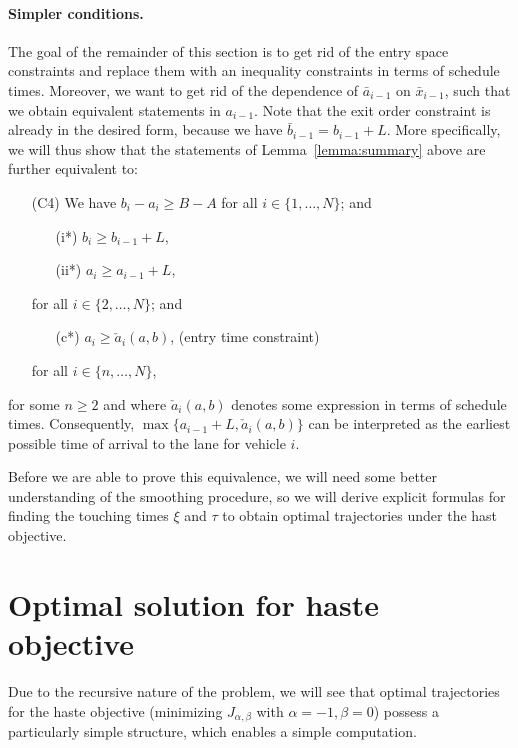 \documentclass[a4paper]{report}
\theoremstyle{definition}
\theoremstyle{plain}
\newcommand\note[1]{{\color{Navy}#1}}
\begin{document}
\paragraph{Simpler conditions.}
The goal of the remainder of this section is to get rid of the entry space
constraints and replace them with an inequality constraints in terms of schedule
times.
%
Moreover, we want to get rid of the dependence of $\bar{a}_{i-1}$ on
$\bar{x}_{i-1}$, such that we obtain equivalent statements in $a_{i-1}$. Note
that the exit order constraint is already in the desired form, because we have
$\bar{b}_{i-1} = b_{i-1} + L$.
%
More specifically, we will thus show that the statements of
Lemma~\ref{lemma:summary} above are further equivalent to:
\begin{enumerate}[leftmargin=3em]
  \item[(C4)] We have $b_{i} - a_{i} \geq B-A$ for all $i \in \{1, \dots, N\}$; and
  \begin{enumerate}[leftmargin=4em,midpenalty=10]
    \item[(i*)\quad] $b_{i} \geq b_{i-1} + L$,
    \item[(ii*)\quad] $a_{i} \geq a_{i-1} + L$,
  \end{enumerate}
  \TabPositions{3cm}
  for all $i \in \{2, \dots, N\}$; and
  \begin{enumerate}[leftmargin=4em,midpenalty=10]
    \item[(c*)\quad] $a_{i} \geq \check{a}_i(a,b)$, \tab (entry time constraint)
  \end{enumerate}
  for all $i \in \{n, \dots, N \}$,
\end{enumerate}
for some $n \geq 2$ and where $\check{a}_{i}(a,b)$ denotes some expression in terms of
schedule times. Consequently, $\max\{a_{i-1} + L, \check{a}_{i}(a,b)\}$ can be
interpreted as the earliest possible time of arrival to the lane for vehicle
$i$.

\note{Before we are able to prove this equivalence, we will need some better
  understanding of the smoothing procedure, so we will derive explicit formulas
  for finding the touching times $\xi$ and $\tau$ to obtain optimal trajectories
  under the hast objective.}

\section{Optimal solution for haste objective}\label{sec:explicit-trajectories}

Due to the recursive nature of the problem, we will see that optimal
trajectories for the haste objective (minimizing $J_{\alpha,\beta}$ with
$\alpha=-1,\beta=0$) possess a particularly simple structure, which enables a
simple computation.
\end{document}
